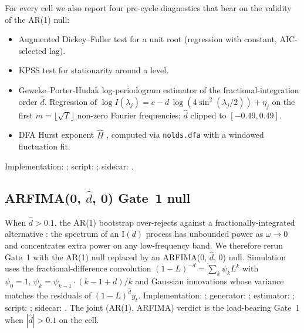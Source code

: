 For every cell we also report four pre-cycle diagnostics that bear
on the validity of the AR(1) null:
\begin{itemize}
\item Augmented Dickey--Fuller test \citep{dickey_fuller1979} for a
  unit root (regression with constant, AIC-selected lag).
\item KPSS test \citep{kpss1992} for stationarity around a level.
\item Geweke--Porter-Hudak log-periodogram estimator
  \citep{geweke_porter_hudak1983} of the fractional-integration
  order \(\hat d\). Regression of
  \(\log I(\lambda_j) = c - d\,\log(4\sin^2(\lambda_j/2)) + \eta_j\)
  on the first \(m = \lfloor\sqrt{T}\rfloor\) non-zero Fourier
  frequencies; \(\hat d\) clipped to \([-0.49, 0.49]\).
\item DFA Hurst exponent \(\hat H\) \citep{peng1994,hurst1951},
  computed via \texttt{nolds.dfa} with a windowed fluctuation
  fit.
\end{itemize}
Implementation:
;
script: ; sidecar:
.

\subsection{ARFIMA(0, \(\hat d\), 0) Gate~1 null}
\label{sec:arfima_null}

When \(\hat d > 0.1\), the AR(1) bootstrap over-rejects against a
fractionally-integrated alternative
\citep{granger_joyeux1980,baillie1996,diebold_rudebusch1989}: the
spectrum of an I\((d)\) process has unbounded power as
\(\omega\to 0\) and concentrates extra power on any low-frequency
band. We therefore rerun Gate~1 with the AR(1) null replaced by an
ARFIMA(0, \(\hat d\), 0) null. Simulation uses the
\citet{hosking1981} fractional-difference convolution
\((1-L)^{-d} = \sum_k \psi_k L^k\) with
\(\psi_0 = 1,\,\psi_k = \psi_{k-1}\cdot(k-1+d)/k\) and Gaussian
innovations whose variance matches the residuals of
\((1-L)^{\hat d} y_t\). Implementation:
;
generator: ;
estimator: ;
script: ; sidecar:
. The joint
(AR(1), ARFIMA) verdict is the load-bearing Gate~1 when
\(|\hat d|>0.1\) on the cell.

